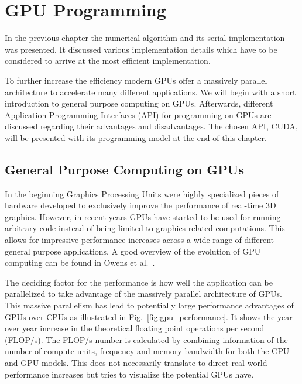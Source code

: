 \chapter{GPU Programming}
\label{cha:gpu_programming}

In the previous chapter the numerical algorithm and its serial implementation was presented. It discussed various implementation details which have to be considered to arrive at the most efficient implementation.

To further increase the efficiency modern GPUs offer a massively parallel architecture to accelerate many different applications. We will begin with a short introduction to general purpose computing on GPUs. Afterwards, different Application Programming Interfaces (API) for programming on GPUs are discussed regarding their advantages and disadvantages. The chosen API, CUDA, will be presented with its programming model at the end of this chapter.

\section{General Purpose Computing on GPUs}
In the beginning Graphics Processing Units were highly specialized pieces of hardware developed to exclusively improve the performance of real-time 3D graphics. However, in recent years GPUs have started to be used for running arbitrary code instead of being limited to graphics related computations. This allows for impressive performance increases across a wide range of different general purpose applications. A good overview of the evolution of GPU computing can be found in Owens et al.~\cite{Owens2008}.

The deciding factor for the performance is how well the application can be parallelized to take advantage of the massively parallel architecture of GPUs. This massive parallelism has lead to potentially large performance advantages of GPUs over CPUs as illustrated in Fig.~\ref{fig:gpu_performance}. It shows the year over year increase in the theoretical floating point operations per second (FLOP/s). The FLOP/s number is calculated by combining information of the number of compute units, frequency and memory bandwidth for both the CPU and GPU models. This does not necessarily translate to direct real world performance increases but tries to visualize the potential GPUs have.


